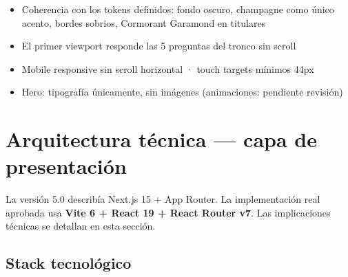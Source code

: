 \documentclass[11pt, a4paper]{article}
\begin{document}
\begin{itemize}[leftmargin=*]
  \item Coherencia con los tokens definidos: fondo oscuro, champagne como único acento,
        bordes sobrios, Cormorant Garamond en titulares
  \item El primer viewport responde las 5 preguntas del tronco sin scroll
  \item Mobile responsive sin scroll horizontal · touch targets mínimos 44px
  \item Hero: tipografía únicamente, sin imágenes (animaciones: pendiente revisión)
\end{itemize}

\newpage


\section{Arquitectura técnica — capa de presentación}

\begin{notatec}
La versión 5.0 describía Next.js 15 + App Router. La implementación real
aprobada usa \textbf{Vite 6 + React 19 + React Router v7}. Las implicaciones
técnicas se detallan en esta sección.
\end{notatec}

\subsection{Stack tecnológico}
\end{document}
